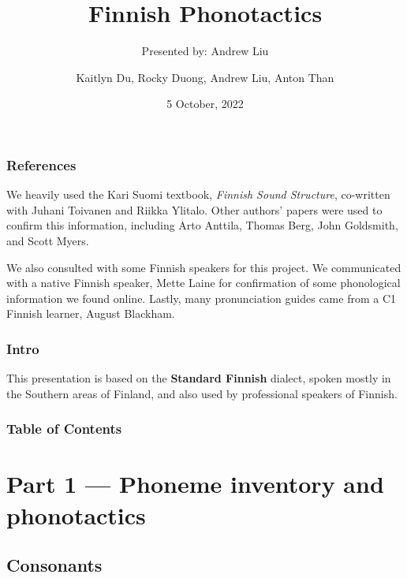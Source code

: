 \documentclass{beamer}
\title[Project Presentation] %
{Finnish Phonotactics}
\subtitle{Presented by: Andrew Liu}
\author{Kaitlyn Du, Rocky Duong, Andrew Liu, Anton Than}
\date {5 October, 2022}
\begin{document}
\renewcommand\thefootnote{\relax}

\frame{\titlepage}

\begin{frame}
	\frametitle{References}
	We heavily used the Kari Suomi textbook, \emph{Finnish Sound Structure}, co-written with Juhani Toivanen and Riikka Ylitalo. Other authors' papers were used to confirm this information, including Arto Anttila, Thomas Berg, John Goldsmith, and Scott Myers.

	We also consulted with some Finnish speakers for this project. We communicated with a native Finnish speaker, Mette Laine for confirmation of some phonological information we found online. Lastly, many pronunciation guides came from a C1 Finnish learner, August Blackham.
\end{frame}

\begin{frame}
	\frametitle{Intro}
	{\large This presentation is based on the \textbf{Standard Finnish} dialect, spoken mostly in the Southern areas of Finland, and also used by professional speakers of Finnish.}
\end{frame}

\begin{frame}
\frametitle{Table of Contents}
\tableofcontents
\end{frame}

\section{Part 1 --- Phoneme inventory and phonotactics}

\subsection{Consonants}
\end{document}
